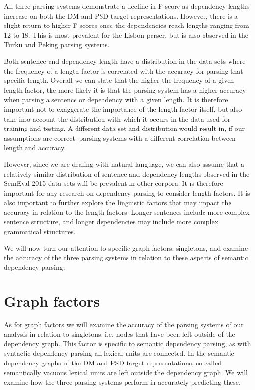 All three parsing systems demonstrate a decline in F-score as dependency lengths increase on both the DM and PSD target representations. However, there is a slight return to higher F-scores once the dependencies reach lengths ranging from 12 to 18. This is most prevalent for the Lisbon parser, but is also observed in the Turku and Peking parsing systems.

Both sentence and dependency length have a distribution in the data sets where the frequency of a length factor is correlated with the accuracy for parsing that specific length. Overall we can state that the higher the frequency of a given length factor, the more likely it is that the parsing system has a higher accuracy when parsing a sentence or dependency with a given length. It is therefore important not to exaggerate the importance of the length factor itself, but also take into account the distribution with which it occurs in the data used for training and testing. A different data set and distribution would result in, if our assumptions are correct, parsing systems with a different correlation between length and accuracy.

However, since we are dealing with natural language, we can also assume that a relatively similar distribution of sentence and dependency lengths observed in the SemEval-2015 data sets will be prevalent in other corpora. It is therefore important for any research on dependency parsing to consider length factors. It is also important to further explore the linguistic factors that may impact the accuracy in relation to the length factors. Longer sentences include more complex sentence structure, and longer dependencies may include more complex grammatical structures.

We will now turn our attention to specific graph factors: singletons, and examine the accuracy of the three parsing systems in relation to these aspects of semantic dependency parsing.













\section{Graph factors}

As for graph factors we will examine the accuracy of the parsing systems of our analysis in relation to singletons, i.e. nodes that have been left outside of the dependency graph. This factor is specific to semantic dependency parsing, as with syntactic dependency parsing all lexical units are connected. In the semantic dependency graphs of the DM and PSD target representations, so-called semantically vacuous lexical units are left outside the dependency graph. We will examine how the three parsing systems perform in accurately predicting these.

